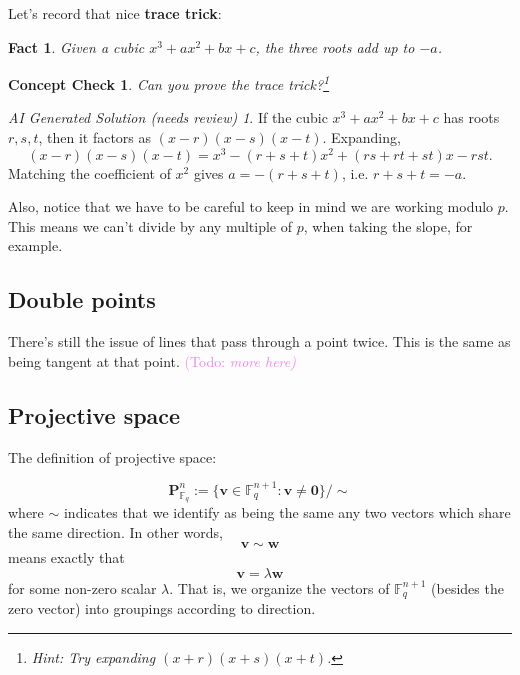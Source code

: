 \documentclass{article}
\theoremstyle{plain}
\newtheorem{checkin}[theorem]{Concept Check}
\newtheorem{fact}[theorem]{Fact}
\theoremstyle{definition}
\theoremstyle{remark}
\newtheorem*{aisolution}{AI Generated Solution (needs review)}
\numberwithin{theorem}{section}
\newcommand{\KS}[1]{\textcolor{violet}{{\sf (Todo:} {\sl{#1})}}}
\newcommand{\KS}[1]{}
\newcommand{\FF}{\mathbb{F}}
\begin{document}
Let's record that nice \textbf{trace trick}:

\begin{fact}
    Given a cubic $x^3 + ax^2 + bx + c$, the three roots add up to $-a$.
\end{fact}

\begin{checkin}
    Can you prove the trace trick?\footnote{Hint: Try expanding $(x+r)(x+s)(x+t)$.}
\end{checkin}
\begin{aisolution}
If the cubic $x^3 + ax^2 + bx + c$ has roots $r,s,t$, then it factors as $(x-r)(x-s)(x-t)$.  Expanding,
\[
(x-r)(x-s)(x-t) = x^3 - (r+s+t)x^2 + (rs+rt+st)x - rst.
\]
Matching the coefficient of $x^2$ gives $a = -(r+s+t)$, i.e. $r+s+t = -a$.
\end{aisolution}

Also, notice that we have to be careful to keep in mind we are working modulo $p$.  This means we can't divide by any multiple of $p$, when taking the slope, for example.

\subsection{Double points}

There's still the issue of lines that pass through a point twice.  This is the same as being tangent at that point.  \KS{more here}



\subsection{Projective space}

The definition of projective space:

\[
\mathbf{P}^n_{\FF_q} := \{ \mathbf{v} \in \FF_q^{n+1} : \mathbf{v} \neq \mathbf{0} \} / \sim
\]
where $\sim$ indicates that we identify as being the same any two vectors which share the same direction.  In other words,
\[
\mathbf{v} \sim \mathbf{w}
\]
means exactly that
\[
\mathbf{v} = \lambda \mathbf{w}
\]
for some non-zero scalar $\lambda$.  That is, we organize the vectors of $\FF_q^{n+1}$ (besides the zero vector) into groupings according to direction.  
\end{document}
